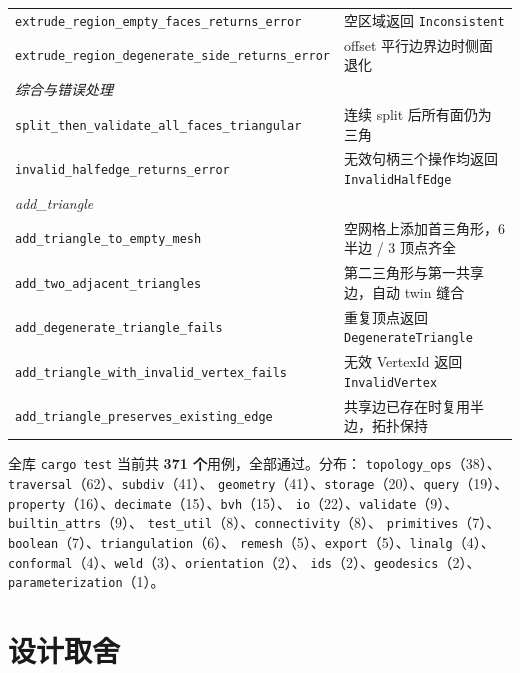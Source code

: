 \documentclass[11pt,a4paper]{article}
\begin{document}
\begin{center}
\begin{longtable}{@{}ll@{}}
  \texttt{extrude\_region\_empty\_faces\_returns\_error} & 空区域返回 \texttt{Inconsistent} \\
  \texttt{extrude\_region\_degenerate\_side\_returns\_error} & offset 平行边界边时侧面退化 \\
  \midrule
  \multicolumn{2}{l}{\textit{综合与错误处理}} \\
  \texttt{split\_then\_validate\_all\_faces\_triangular} & 连续 split 后所有面仍为三角 \\
  \texttt{invalid\_halfedge\_returns\_error}         & 无效句柄三个操作均返回 \texttt{InvalidHalfEdge} \\
  \midrule
  \multicolumn{2}{l}{\textit{add\_triangle}} \\
  \texttt{add\_triangle\_to\_empty\_mesh}            & 空网格上添加首三角形，6 半边 / 3 顶点齐全 \\
  \texttt{add\_two\_adjacent\_triangles}             & 第二三角形与第一共享边，自动 twin 缝合 \\
  \texttt{add\_degenerate\_triangle\_fails}          & 重复顶点返回 \texttt{DegenerateTriangle} \\
  \texttt{add\_triangle\_with\_invalid\_vertex\_fails} & 无效 VertexId 返回 \texttt{InvalidVertex} \\
  \texttt{add\_triangle\_preserves\_existing\_edge}  & 共享边已存在时复用半边，拓扑保持 \\
  \bottomrule
\end{longtable}
\end{center}

全库 \texttt{cargo test} 当前共 \textbf{371 个}用例，全部通过。分布：
\texttt{topology\_ops}（38）、\texttt{traversal}（62）、\texttt{subdiv}（41）、
\texttt{geometry}（41）、\texttt{storage}（20）、\texttt{query}（19）、
\texttt{property}（16）、\texttt{decimate}（15）、\texttt{bvh}（15）、
\texttt{io}（22）、\texttt{validate}（9）、\texttt{builtin\_attrs}（9）、
\texttt{test\_util}（8）、\texttt{connectivity}（8）、
\texttt{primitives}（7）、\texttt{boolean}（7）、\texttt{triangulation}（6）、
\texttt{remesh}（5）、\texttt{export}（5）、\texttt{linalg}（4）、
\texttt{conformal}（4）、\texttt{weld}（3）、\texttt{orientation}（2）、
\texttt{ids}（2）、\texttt{geodesics}（2）、\texttt{parameterization}（1）。

\section{设计取舍}
\end{document}
